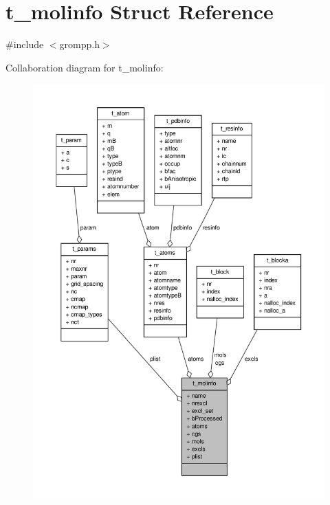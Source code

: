 \hypertarget{structt__molinfo}{\section{t\-\_\-molinfo \-Struct \-Reference}
\label{structt__molinfo}
}


{\ttfamily \#include $<$grompp.\-h$>$}



\-Collaboration diagram for t\-\_\-molinfo\-:
\nopagebreak
\begin{figure}[H]
\begin{center}
\leavevmode
\includegraphics[width=350pt]{structt__molinfo__coll__graph}
\end{center}
\end{figure}
